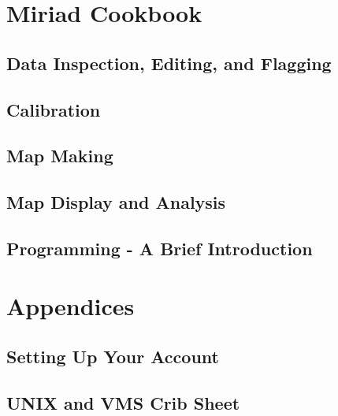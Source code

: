 \part{Miriad Cookbook}
\chapter		{Data Inspection, Editing, and Flagging}
 
\cleardoublepage
\chapter		{Calibration}
 
\cleardoublepage
\chapter		{Map Making}
 
\cleardoublepage
\chapter		{Map Display and Analysis}
 
\cleardoublepage
\chapter		{Programming - A Brief Introduction}
 
\appendix
\cleardoublepage
\part{Appendices}
\chapter		{Setting Up Your Account}
 
\cleardoublepage
\chapter		{UNIX and VMS Crib Sheet}
 
%
\cleardoublepage
